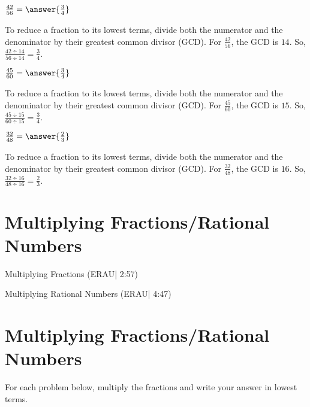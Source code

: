 \documentclass{ximera}
\begin{document}
\begin{problem}
$\frac{42}{56} = \answer{\frac{3}{4}}$
\begin{feedback}
To reduce a fraction to its lowest terms, divide both the numerator and the denominator by their greatest common divisor (GCD). For $\frac{42}{56}$, the GCD is $14$. So, $\frac{42 \div 14}{56 \div 14} = \frac{3}{4}$.
\end{feedback}
\end{problem}

\begin{problem}
$\frac{45}{60} = \answer{\frac{3}{4}}$
\begin{feedback}
To reduce a fraction to its lowest terms, divide both the numerator and the denominator by their greatest common divisor (GCD). For $\frac{45}{60}$, the GCD is $15$. So, $\frac{45 \div 15}{60 \div 15} = \frac{3}{4}$.
\end{feedback}
\end{problem}

\begin{problem}
$\frac{32}{48} = \answer{\frac{2}{3}}$
\begin{feedback}
To reduce a fraction to its lowest terms, divide both the numerator and the denominator by their greatest common divisor (GCD). For $\frac{32}{48}$, the GCD is $16$. So, $\frac{32 \div 16}{48 \div 16} = \frac{2}{3}$.
\end{feedback}
\end{problem}


\section*{Multiplying Fractions/Rational Numbers}

Multiplying Fractions (ERAU| 2:57)


Multiplying Rational Numbers (ERAU| 4:47)



\section*{Multiplying Fractions/Rational Numbers}

For each problem below, multiply the fractions and write your answer in lowest terms.
\end{document}
